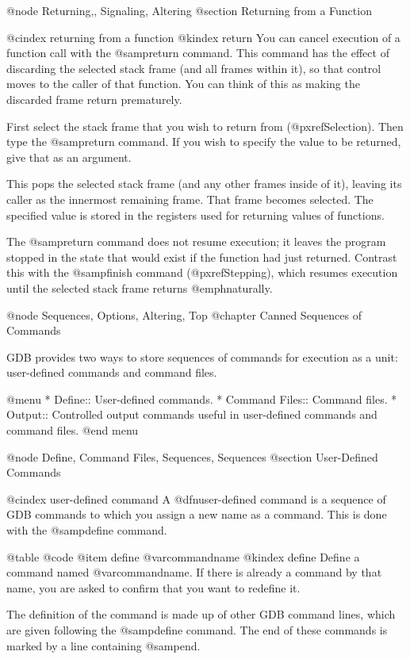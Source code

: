 @node Returning,, Signaling, Altering
@section Returning from a Function

@cindex returning from a function
@kindex return
You can cancel execution of a function call with the @samp{return}
command.  This command has the effect of discarding the selected stack
frame (and all frames within it), so that control moves to the caller of
that function.  You can think of this as making the discarded frame
return prematurely.

First select the stack frame that you wish to return from
(@pxref{Selection}).  Then type the @samp{return} command.  If you wish
to specify the value to be returned, give that as an argument.

This pops the selected stack frame (and any other frames inside of it),
leaving its caller as the innermost remaining frame.  That frame becomes
selected.  The specified value is stored in the registers used for
returning values of functions.

The @samp{return} command does not resume execution; it leaves the
program stopped in the state that would exist if the function had just
returned.  Contrast this with the @samp{finish} command
(@pxref{Stepping}), which resumes execution until the selected stack
frame returns @emph{naturally}.

@node Sequences, Options, Altering, Top
@chapter Canned Sequences of Commands

GDB provides two ways to store sequences of commands for execution as a
unit: user-defined commands and command files.

@menu
* Define::         User-defined commands.
* Command Files::  Command files.
* Output::         Controlled output commands useful in
                   user-defined commands and command files.
@end menu

@node Define, Command Files, Sequences, Sequences
@section User-Defined Commands

@cindex user-defined command
A @dfn{user-defined command} is a sequence of GDB commands to which you
assign a new name as a command.  This is done with the @samp{define}
command.

@table @code
@item define @var{commandname}
@kindex define
Define a command named @var{commandname}.  If there is already a command
by that name, you are asked to confirm that you want to redefine it.

The definition of the command is made up of other GDB command lines,
which are given following the @samp{define} command.  The end of these
commands is marked by a line containing @samp{end}.

